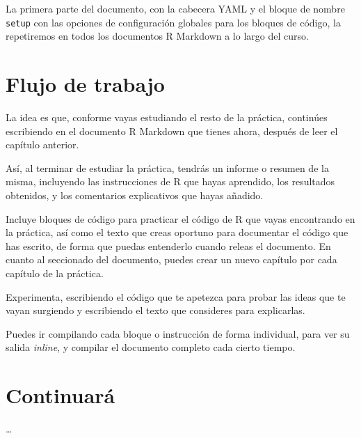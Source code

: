 \documentclass[
  degree=mecinf,
  title=normal,
  toc=normal,
  bib=normal]{mnye}
\begin{document}
La primera parte del documento, con la cabecera YAML y el bloque de nombre \texttt{setup} con las opciones de configuración globales para los bloques de código, la repetiremos en todos los documentos R Markdown a lo largo del curso.

\hypertarget{flow}{%
\section{Flujo de trabajo}\label{flow}}

La idea es que, conforme vayas estudiando el resto de la práctica, continúes escribiendo en el documento R Markdown que tienes ahora, después de leer el capítulo anterior.

Así, al terminar de estudiar la práctica, tendrás un informe o resumen de la misma, incluyendo las instrucciones de \textsf{R} que hayas aprendido, los resultados obtenidos, y los comentarios explicativos que hayas añadido.

Incluye bloques de código para practicar el código de \textsf{R} que vayas encontrando en la práctica, así como el texto que creas oportuno para documentar el código que has escrito, de forma que puedas entenderlo cuando releas el documento. En cuanto al seccionado del documento, puedes crear un nuevo capítulo por cada capítulo de la práctica.

Experimenta, escribiendo el código que te apetezca para probar las ideas que te vayan surgiendo y escribiendo el texto que consideres para explicarlas.

Puedes ir compilando cada bloque o instrucción de forma individual, para ver su salida \emph{inline}, y compilar el documento completo cada cierto tiempo.

\hypertarget{tbc}{%
\section{Continuará}\label{tbc}}

\ldots{}

\end{document}
